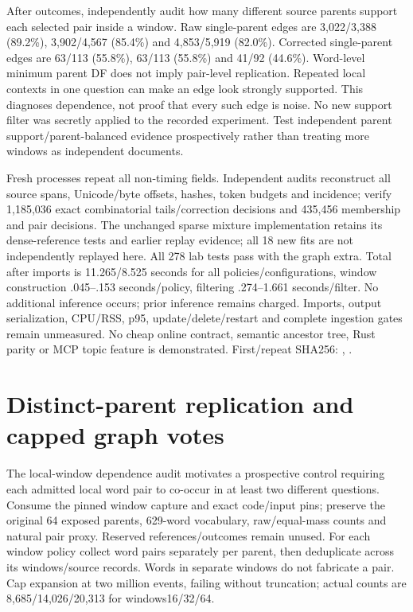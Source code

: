 \documentclass[11pt]{article}
\begin{document}
After outcomes, independently audit how many different source parents support
each selected pair inside a window. Raw single-parent edges are
3,022/3,388 (89.2\%), 3,902/4,567 (85.4\%) and 4,853/5,919 (82.0\%). Corrected
single-parent edges are 63/113 (55.8\%), 63/113 (55.8\%) and 41/92 (44.6\%).
Word-level minimum parent DF does not imply pair-level replication. Repeated
local contexts in one question can make an edge look strongly supported.
This diagnoses dependence, not proof that every such edge is noise. No new
support filter was secretly applied to the recorded experiment. Test independent
parent support/parent-balanced evidence prospectively rather than treating more
windows as independent documents.

Fresh processes repeat all non-timing fields. Independent audits reconstruct all
source spans, Unicode/byte offsets, hashes, token budgets and incidence; verify
1,185,036 exact combinatorial tails/correction decisions and 435,456 membership
and pair decisions. The unchanged sparse mixture implementation retains its
dense-reference tests and earlier replay evidence; all 18 new fits are not
independently replayed here. All 278 lab tests pass with the graph extra.
Total after imports is 11.265/8.525 seconds for all policies/configurations,
window construction .045--.153 seconds/policy, filtering .274--1.661 seconds/filter.
No additional inference occurs; prior inference remains charged. Imports, output
serialization, CPU/RSS, p95, update/delete/restart and complete ingestion gates
remain unmeasured. No cheap online contract, semantic ancestor tree, Rust parity
or MCP topic feature is demonstrated. First/repeat SHA256:
,
.

\section{Distinct-parent replication and capped graph votes}
The local-window dependence audit motivates a prospective control requiring
each admitted local word pair to co-occur in at least two different questions.
Consume the pinned window capture and exact code/input pins; preserve the
original 64 exposed parents, 629-word vocabulary, raw/equal-mass counts and
natural pair proxy. Reserved references/outcomes remain unused. For each window
policy collect word pairs separately per parent, then deduplicate across its
windows/source records. Words in separate windows do not fabricate a pair.
Cap expansion at two million events, failing without truncation; actual counts
are 8,685/14,026/20,313 for windows16/32/64.
\end{document}
